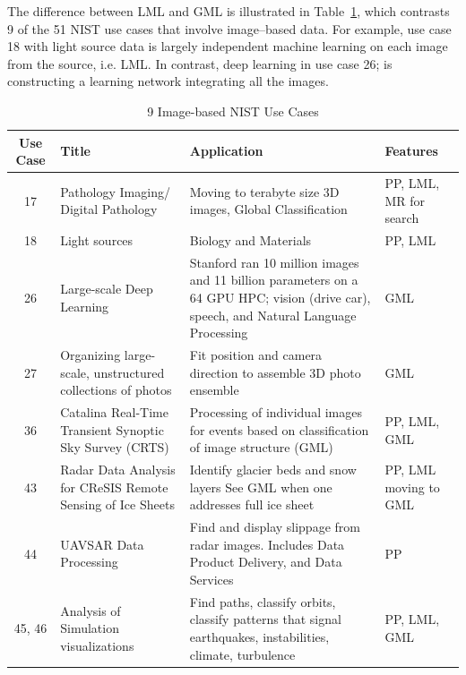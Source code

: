\documentclass{acm_proc_article-sp}
\begin{document}
The difference between LML and GML is illustrated in Table~\ref{Table3}, which contrasts 9 of the 51 NIST use cases that involve image--based data. For example, use case 18 with light source data is largely independent machine learning on each image from the source, i.e. LML. In contrast, deep learning in use case 26; is constructing a learning network integrating all the images.


\begin{table}
\centering
\caption{9 Image-based NIST Use Cases}
\label{Table3}
\begin{tabular}{|c|p{3cm}|p{7cm}|p{2cm}|} \hline
\textbf{Use Case} & \textbf{Title} & \textbf{Application} & \textbf{Features} \\ \hline
17 & Pathology Imaging/ Digital Pathology & Moving to terabyte size 3D images, Global Classification & PP, LML, MR for search \\ \hline
18 & Light sources & Biology and Materials & PP, LML \\ \hline
26 & Large-scale Deep Learning & Stanford ran 10 million images and 11 billion parameters on a 64 GPU HPC; vision (drive car), speech, and Natural Language Processing & GML \\ \hline
27 & Organizing large-scale, unstructured collections of photos & Fit position and camera direction to assemble 3D photo ensemble & GML \\ \hline
36 & Catalina Real-Time Transient Synoptic Sky Survey (CRTS) & Processing of individual images for events based on classification of image structure (GML) & PP, LML, GML \\ \hline
43 & Radar Data Analysis for CReSIS Remote Sensing of Ice Sheets & Identify glacier beds and snow layers \newline See GML when one addresses full ice sheet & PP, LML moving to GML \\ \hline
44 & UAVSAR Data Processing & Find and display slippage from radar images. Includes Data Product Delivery, and Data Services & PP \\ \hline
45, 46 & Analysis of Simulation visualizations & Find paths, classify orbits, classify patterns that signal earthquakes, instabilities, climate, turbulence & PP, LML, GML \\ \hline
\end{tabular}
\end{table}
\end{document}
